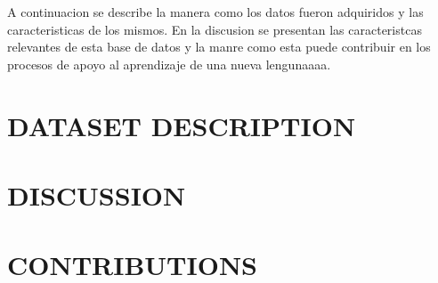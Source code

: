 \documentclass[letterpaper, 10 pt, conference]{ieeeconf}  %
\begin{document}
A continuacion se describe la manera como los datos fueron adquiridos y las caracteristicas de los mismos. En la discusion se presentan las caracteristcas relevantes de esta base de datos y la manre como esta puede contribuir en los procesos de apoyo al aprendizaje de una nueva lengunaaaa.

\section{DATASET DESCRIPTION}

\section{DISCUSSION}

\section{CONTRIBUTIONS}
\end{document}
